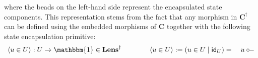 \documentclass[acmsmall,screen,review,anonymous]{acmart}
\newcommand{\kw}[1]{\ensuremath{ \mathsf{#1} }}
\renewcommand{\preceq}{\le}
\newcommand{\intl}[1]{\underline{#1}}
\begin{document}
where the beads on the left-hand side
represent the encapsulated state components.
This representation stems from the fact that
any morphism in $\mathbf{C}^\dagger$
can be defined using the embedded morphisms of $\mathbf{C}$
together with the following state encapsulation primitive:
\[
  \langle u \in U \rangle : U \rightarrow \mathbbm{1} \in \mathbf{Lens}^\dagger
  \qquad \qquad
  \langle u \in U \rangle  :=  (u \in U \mid \kw{id}_U)
    = \quad u \circ \!\!-
\]

%

\end{document}
